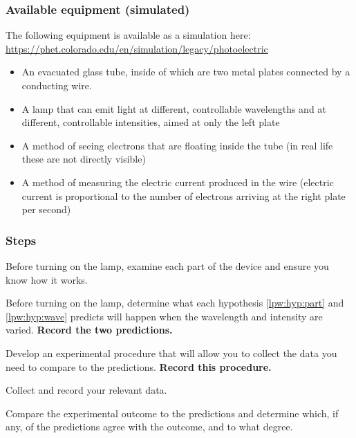 \subsubsection{Available equipment (simulated)}

The following equipment is available as a simulation here: \url{https://phet.colorado.edu/en/simulation/legacy/photoelectric}

\begin{itemize}
	\item An evacuated glass tube, inside of which are two metal plates connected by a conducting wire.
	
	\item A lamp that can emit light at different, controllable wavelengths and at different, controllable intensities, aimed at only the left plate
	
	\item A method of seeing electrons that are floating inside the tube (in real life these are not directly visible)
	
	\item A method of measuring the electric current produced in the wire (electric current is proportional to the number of electrons arriving at the right plate per second)
\end{itemize}

\subsubsection{Steps}

\begin{steps}

	\item Before turning on the lamp, examine each part of the device and ensure you know how it works.
	
	\item Before turning on the lamp, determine what each hypothesis \ref{lpw:hyp:part} and \ref{lpw:hyp:wave} predicts will happen when the wavelength and intensity are varied. \textbf{Record the two predictions.}
	
	\item Develop an experimental procedure that will allow you to collect the data you need to compare to the predictions. \textbf{Record this procedure.}
	
	\item Collect and record your relevant data.
	
	\item Compare the experimental outcome to the predictions and determine which, if any, of the predictions agree with the outcome, and to what degree.
\end{steps}


